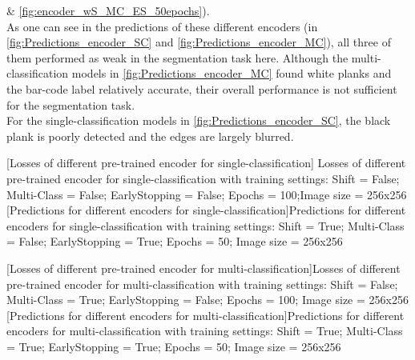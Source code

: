 \& \cref{fig:encoder_wS_MC_ES_50epochs}).\\
As one can see in the predictions of these different encoders (in \cref{fig:Predictions_encoder_SC} and \cref{fig:Predictions_encoder_MC}), all three of them performed as weak in the segmentation task here. Although the multi-classification models in \cref{fig:Predictions_encoder_MC} found white planks and the bar-code label relatively accurate, their overall performance is not sufficient for the segmentation task.\\
For the single-classification models in \cref{fig:Predictions_encoder_SC}, the black plank is poorly detected and the edges are largely blurred.\\
\begin{minipage}{\textwidth}
	
	[Losses of different pre-trained encoder for single-classification]{ Losses of different pre-trained encoder for single-classification with training settings: Shift = False; Multi-Class = False; EarlyStopping = False; Epochs = 100;Image size = 256x256}
	\label{fig:encoder_nS_SC_100epochs}
	\hspace{0.6cm}
	[Predictions for different encoders for single-classification]{Predictions for different encoders for single-classification with training settings: Shift = True; Multi-Class = False; EarlyStopping = True; Epochs = 50; Image size = 256x256}
	\label{fig:Predictions_encoder_SC}
\end{minipage}
\newpage
\begin{minipage}{\textwidth}
	
	[Losses of different pre-trained encoder for multi-classification]{Losses of different pre-trained encoder for multi-classification with training settings: Shift = False; Multi-Class = True; EarlyStopping = False; Epochs = 100; Image size = 256x256}
	\label{fig:encoder_nS_MC_100epochs}
	\hspace{0.6cm}
	[Predictions for different encoders for multi-classification]{Predictions for different encoders for multi-classification with training settings: Shift = True; Multi-Class = True; EarlyStopping = True; Epochs = 50; Image size = 256x256}
	\label{fig:Predictions_encoder_MC}
	\vspace{5mm}
\end{minipage}

